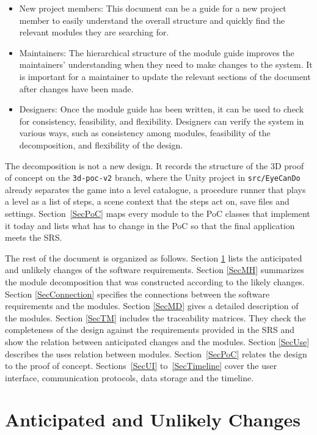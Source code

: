 \documentclass[12pt, titlepage]{article}
\begin{document}
\begin{itemize}
\item New project members: This document can be a guide for a new project member
  to easily understand the overall structure and quickly find the
  relevant modules they are searching for.
\item Maintainers: The hierarchical structure of the module guide improves the
  maintainers' understanding when they need to make changes to the system. It is
  important for a maintainer to update the relevant sections of the document
  after changes have been made.
\item Designers: Once the module guide has been written, it can be used to
  check for consistency, feasibility, and flexibility. Designers can verify the
  system in various ways, such as consistency among modules, feasibility of the
  decomposition, and flexibility of the design.
\end{itemize}

The decomposition is not a new design. It records the structure of the 3D
proof of concept on the \texttt{3d-poc-v2} branch, where the Unity project in
\texttt{src/EyeCanDo} already separates the game into a level catalogue, a
procedure runner that plays a level as a list of steps, a scene context that
the steps act on, save files and settings. Section~\ref{SecPoC} maps every
module to the PoC classes that implement it today and lists what has to change
in the PoC so that the final application meets the SRS.

The rest of the document is organized as follows. Section
\ref{SecChange} lists the anticipated and unlikely changes of the software
requirements. Section \ref{SecMH} summarizes the module decomposition that
was constructed according to the likely changes. Section \ref{SecConnection}
specifies the connections between the software requirements and the
modules. Section \ref{SecMD} gives a detailed description of the
modules. Section \ref{SecTM} includes the traceability matrices. They check
the completeness of the design against the requirements provided in the SRS and
show the relation between anticipated changes and the modules. Section
\ref{SecUse} describes the uses relation between modules. Section~\ref{SecPoC}
relates the design to the proof of concept. Sections~\ref{SecUI}
to~\ref{SecTimeline} cover the user interface, communication protocols, data
storage and the timeline.

\section{Anticipated and Unlikely Changes} \label{SecChange}
\end{document}
